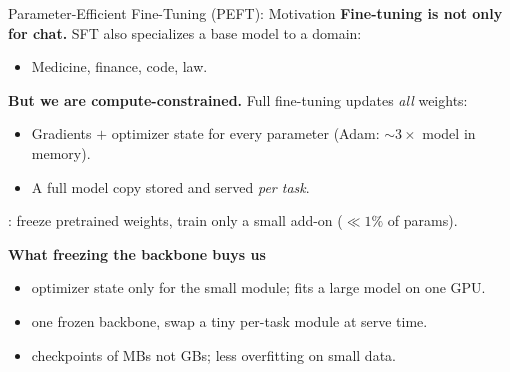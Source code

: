 \begin{frame}{Parameter-Efficient Fine-Tuning (PEFT): Motivation}
  \textbf{Fine-tuning is not only for chat.} SFT also specializes a base model to a domain:
  \begin{itemize}[nosep]
    \item Medicine, finance, code, law.
  \end{itemize}

  \vspace{0.3em}
  \textbf{But we are compute-constrained.} Full fine-tuning updates \emph{all} weights:
  \begin{itemize}[nosep]
    \item Gradients $+$ optimizer state for every parameter (Adam: $\sim\!3\times$ model in memory).
    \item A full model copy stored and served \emph{per task}.
  \end{itemize}

  \vspace{0.3em}
  : freeze pretrained weights, train only a small add-on ($\ll 1\%$ of params).

  \vspace{0.2em}
  \textbf{What freezing the backbone buys us}
  \begin{itemize}[nosep]
    \item {} optimizer state only for the small module; fits a large model on one GPU.
    \item {} one frozen backbone, swap a tiny per-task module at serve time.
    \item {} checkpoints of MBs not GBs; less overfitting on small data.
  \end{itemize}
\end{frame}

